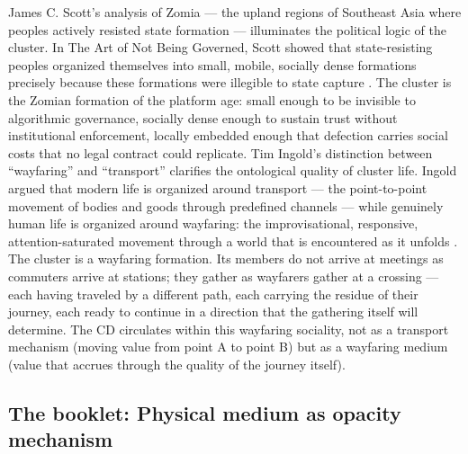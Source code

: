 James C. Scott’s analysis of Zomia — the upland regions of Southeast Asia where peoples actively resisted state formation — illuminates the political logic of the cluster. In The Art of Not Being Governed, Scott showed that state-resisting peoples organized themselves into small, mobile, socially dense formations precisely because these formations were illegible to state capture \cite{scott_2009}. The cluster is the Zomian formation of the platform age: small enough to be invisible to algorithmic governance, socially dense enough to sustain trust without institutional enforcement, locally embedded enough that defection carries social costs that no legal contract could replicate. Tim Ingold’s distinction between “wayfaring” and “transport” clarifies the ontological quality of cluster life. Ingold argued that modern life is organized around transport — the point-to-point movement of bodies and goods through predefined channels — while genuinely human life is organized around wayfaring: the improvisational, responsive, attention-saturated movement through a world that is encountered as it unfolds \cite[pp.~12--35]{ingold_2011}. The cluster is a wayfaring formation. Its members do not arrive at meetings as commuters arrive at stations; they gather as wayfarers gather at a crossing — each having traveled by a different path, each carrying the residue of their journey, each ready to continue in a direction that the gathering itself will determine. The CD circulates within this wayfaring sociality, not as a transport mechanism (moving value from point A to point B) but as a wayfaring medium (value that accrues through the quality of the journey itself).

\subsection{The booklet: Physical medium as opacity mechanism}

